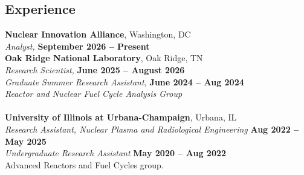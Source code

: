 \documentclass[margin,line]{resume}
\begin{document}
\begin{resume}
    \section{\mysidestyle Experience}
    \textbf{Nuclear Innovation Alliance}, Washington, DC\\
                \textsl{Analyst,} \hfill \textbf{September 2026 -- Present}\\
    \textbf{Oak Ridge National Laboratory}, Oak Ridge, TN\\
                \textsl{Research Scientist,} \hfill \textbf{June 2025 -- August 2026}\\
                \textsl{Graduate Summer Research Assistant,} \hfill \textbf{June 2024 -- Aug 2024}\\
                \textsl{Reactor and Nuclear Fuel Cycle Analysis Group}\\\\
    \textbf{University of Illinois at Urbana-Champaign}, Urbana, IL\\
                \textsl{Research Assistant, Nuclear Plasma and Radiological Engineering} \hfill \textbf{Aug 2022 -- May 2025}\\
                \textsl{Undergraduate Research Assistant} \hfill \textbf{May 2020 -- Aug 2022}\\
                Advanced Reactors and Fuel Cycles group.


\end{resume}
\end{document}
